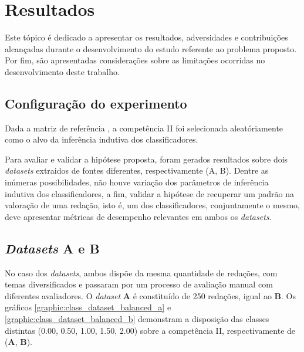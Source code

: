 \section{Resultados}

Este tópico é dedicado a apresentar os resultados, adversidades e contribuições 
alcançadas durante o desenvolvimento do estudo referente ao problema proposto. 
Por fim, são apresentadas considerações sobre as limitações ocorridas no 
desenvolvimento deste trabalho.

\subsection{Configuração do experimento}

Dada a matriz de referência \cite{matriz_referencia_redacao:2016}, a 
competência II foi selecionada aleatóriamente como o alvo da inferência 
indutiva dos classificadores. 

Para avaliar e validar a hipótese proposta, foram gerados resultados sobre dois 
\textit{datasets} extraidos de fontes diferentes, respectivamente (A, B).
Dentre as inúmeras possibilidades, não houve variação dos parâmetros de 
inferência indutiva dos classificadores, a fim, validar a hipótese de recuperar 
um padrão na valoração de uma redação, isto é, um dos classificadores, 
conjuntamente o mesmo, deve apresentar métricas de desempenho relevantes em 
ambos os \textit{datasets}.

\subsection{\textit{Datasets} \textbf{A} e \textbf{B}}

No caso dos \textit{datasets}, ambos dispõe da mesma quantidade de redações, com 
temas diversificados e passaram por um processo de avaliação manual com 
diferentes avaliadores. O \textit{dataset} \textbf{A} é constituído de 250 
redações, igual ao \textbf{B}. Os gráficos 
\ref{graphic:class_dataset_balanced_a} e \ref{graphic:class_dataset_balanced_b} 
demonstram a disposição das classes distintas (0.00, 0.50, 1.00, 1.50, 2.00) 
sobre a competência II, respectivamente de (\textbf{A}, \textbf{B}).

\datasetAall

